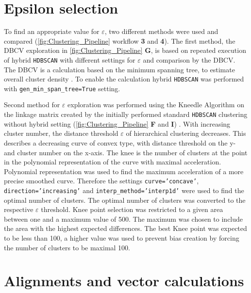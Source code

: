 \section{Epsilon selection} \label{sec:epsilon}

To find an appropriate value for $\varepsilon$, two different methods were used and compared (\autoref{fig:Clustering_Pipeline} workflow \textsf{\textbf{3}} and \textsf{\textbf{4}}). The first method, the \gls{DBCV} exploration in \autoref{fig:Clustering_Pipeline} \textsf{\textbf{G}}, is based on repeated execution of hybrid \texttt{HDBSCAN} with different settings for $\varepsilon$ and comparison by the \gls{DBCV}. The \gls{DBCV} is a calculation based on the minimum spanning tree, to estimate overall cluster density \autocite{moulavi_density-based_2014}. To enable the calculation hybrid \texttt{HDBSCAN} was performed with \texttt{gen\_min\_span\_tree=True} setting.

\vspace{1em}

Second method for $\varepsilon$ exploration was performed using the Kneedle Algorithm on the linkage matrix created by the initially performed standard \texttt{HDBSCAN} clustering without hybrid setting (\autoref{fig:Clustering_Pipeline} \textsf{\textbf{F}} and \textsf{\textbf{I}}) \autocite{satopaa_finding_2011}. With increasing cluster number, the distance threshold $\varepsilon$ of hierarchical clustering decreases. This describes a decreasing curve of convex type, with distance threshold on the y- and cluster number on the x-axis. The knee is the number of clusters at the point in the polynomial representation of the curve with maximal acceleration. Polynomial representation was used to find the maximum acceleration of a more precise smoothed curve. Therefore the settings \texttt{curve='concave'}, \texttt{direction='increasing'} and \texttt{interp\_method='interp1d'} were used to find the optimal number of clusters. The optimal number of clusters was converted to the respective $\varepsilon$ threshold. Knee point selection was restricted to a given area between one and a maximum value of 500. The maximum was chosen to include the area with the highest expected differences. The best Knee point was expected to be less than 100, a higher value was used to prevent bias creation by forcing the number of clusters to be maximal 100. 

\section{Alignments and vector calculations} \label{sec:MAFFT}

